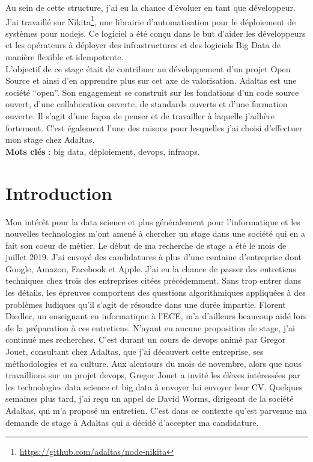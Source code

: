 \documentclass[12pt, french]{report}
\begin{document}
Au sein de cette structure, j'ai eu la chance d'évoluer en tant que développeur. J'ai travaillé sur Nikita\footnote{\href{https://github.com/adaltas/node-nikita}{https://github.com/adaltas/node-nikita}}, une librairie d’automatisation pour le déploiement de systèmes pour \gls{nodejs}. Ce logiciel a été conçu dans le but d'aider les développeurs et les opérateurs à déployer des infrastructures et des logiciels Big Data de manière flexible et idempotente.\\

L'objectif de ce stage était de contribuer au développement d'un projet Open Source et ainsi d'en apprendre plus sur cet axe de valorisation. Adaltas est une société “open”. Son engagement se construit sur les fondations d’un code source ouvert, d’une collaboration ouverte, de standards ouverts et d’une formation ouverte. Il s'agit d'une façon de penser et de travailler à laquelle j'adhère fortement. C'est également l'une des raisons pour lesquelles j'ai choisi d'effectuer mon stage chez Adaltas.\\

\noindent\textbf{Mots clés} : big data, déploiement, devops, infraops.

\begingroup
\hypersetup{linkcolor=black}
\listoffigures
\tableofcontents
\newpage
\endgroup

\chapter*{Introduction}

Mon intérêt pour la data science et plus généralement pour l’informatique et les nouvelles technologies m’ont amené à chercher un stage dans une société qui en a fait son coeur de métier. Le début de ma recherche de stage a été le mois de juillet 2019. J'ai envoyé des candidatures à plus d'une centaine d'entreprise dont Google, Amazon, Facebook et Apple. J'ai eu la chance de passer des entretiens techniques chez trois des entreprises citées précédemment. Sans trop entrer dans les détails, les épreuves comportent des questions algorithmiques appliquées à des problèmes ludiques qu'il s'agit de résoudre dans une durée impartie. Florent Diedler, un enseignant en informatique à l'ECE, m'a d'ailleurs beaucoup aidé lors de la préparation à ces entretiens. N'ayant eu aucune proposition de stage, j'ai continué mes recherches. C'est durant un cours de \gls{devops} animé par Gregor Jouet, consultant chez Adaltas, que j'ai découvert cette entreprise, ses méthodologies et sa culture. Aux alentours du mois de novembre, alors que nous travaillions sur un projet \gls{devops}, Gregor Jouet a invité les élèves intéressées par les technologies data science et big data à envoyer lui envoyer leur CV. Quelques semaines plus tard, j'ai reçu un appel de David Worms, dirigeant de la société Adaltas, qui m'a proposé un entretien. C'est dans ce contexte qu'est parvenue ma demande de stage à Adaltas qui a décidé d'accepter ma candidature.\\
\end{document}
